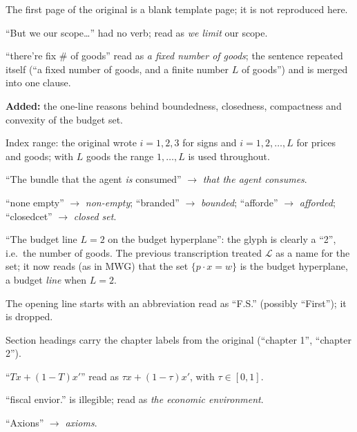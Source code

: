 \documentclass[11pt]{article}
\begin{document}
\begin{transcriptnotes}
  \item The first page of the original is a blank template page; it is not
        reproduced here.
  \item ``But we our scope\dots'' had no verb; read as \emph{we limit} our scope.
  \item ``there're fix \# of goods'' read as \emph{a fixed number of goods}; the
        sentence repeated itself (``a fixed number of goods, and a finite number
        $L$ of goods'') and is merged into one clause.
  \item \textbf{Added:} the one-line reasons behind boundedness, closedness,
        compactness and convexity of the budget set.
  \item Index range: the original wrote $i=1,2,3$ for signs and $i=1,2,\dots,L$
        for prices and goods; with $L$ goods the range $1,\dots,L$ is used
        throughout.
  \item ``The bundle that the agent \emph{is} consumed'' $\to$
        \emph{that the agent consumes}.
  \item ``none empty'' $\to$ \emph{non-empty}; ``branded'' $\to$ \emph{bounded};
        ``afforde'' $\to$ \emph{afforded}; ``closedcet'' $\to$ \emph{closed set}.
  \item ``The budget line $L=2$ on the budget hyperplane'': the glyph is clearly
        a ``2'', i.e.\ the number of goods. The previous transcription treated
        $\mathcal{L}$ as a name for the set; it now reads (as in MWG) that the
        set $\{p\cdot x=w\}$ is the budget hyperplane, a budget \emph{line}
        when $L=2$.
  \item The opening line starts with an abbreviation read as ``F.S.''
        (possibly ``First''); it is dropped.
  \item Section headings carry the chapter labels from the original
        (``chapter 1'', ``chapter 2'').
  \item ``$Tx+(1-T)x'$'' read as $\tau x+(1-\tau)x'$, with $\tau\in[0,1]$.
  \item ``fiscal envior.'' is illegible; read as \emph{the economic environment}.
  \item ``Axions'' $\to$ \emph{axioms}.
\end{transcriptnotes}
\end{document}
